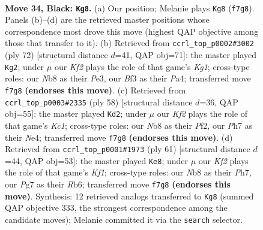 \documentclass[11pt]{article}
\begin{document}
\clearpage

\begin{figure}[p]\centering
\begin{subfigure}{0.46\textwidth}\centering
\resizebox{\linewidth}{!}{%
\newchessgame
\chessboard[
  setfen={rn6/p1R2kpp/5p2/1P2p2P/P7/4Nb2/8/R1K5 b - - 7 34},
  showmover=false,
  pgfstyle=straightmove, color=movearrow, markmove={f7-g8}
]}
\caption{}
\end{subfigure}\hfill
\begin{subfigure}{0.46\textwidth}\centering
\resizebox{\linewidth}{!}{%
\newchessgame
\chessboard[
  setfen={1r3k2/6p1/p1B2p1p/8/PPR5/4P1P1/5P1P/3r2K1 w - - 3 37},
  showmover=false,
  pgfstyle=straightmove, color=movearrow, markmove={g1-g2}
]}
\caption{}
\end{subfigure}
\\[4pt]
\begin{subfigure}{0.46\textwidth}\centering
\resizebox{\linewidth}{!}{%
\newchessgame
\chessboard[
  setfen={3r3k/5p1n/4p2B/1p2P3/3pN3/P7/1PP2P1R/2K3r1 w - - 2 30},
  showmover=false,
  pgfstyle=straightmove, color=movearrow, markmove={c1-d2}
]}
\caption{}
\end{subfigure}\hfill
\begin{subfigure}{0.46\textwidth}\centering
\resizebox{\linewidth}{!}{%
\newchessgame
\chessboard[
  setfen={5k2/1p4pp/pr6/1b4P1/3P1R1P/2N5/1P3K2/8 b - - 1 31},
  showmover=false,
  pgfstyle=straightmove, color=movearrow, markmove={f8-e8}
]}
\caption{}
\end{subfigure}
\caption{\textbf{Move 34, Black: \texttt{Kg8}.} (a) Our position; Melanie plays \texttt{Kg8} (\texttt{f7g8}). Panels (b)--(d) are the retrieved master positions whose correspondence most drove this move (highest QAP objective among those that transfer to it). (b) Retrieved from \texttt{ccrl\_top\_p0002\#3002} (ply 72) [structural distance $d$=41, QAP obj=71]: the master played \texttt{Kg2}; under $\mu$ our \emph{Kf2} plays the role of that game's \emph{Kg1}; cross-type roles: our \emph{N}b8 as their \emph{P}e3, our \emph{B}f3 as their \emph{P}a4; transferred move \texttt{f7g8} \textbf{(endorses this move)}. (c) Retrieved from \texttt{ccrl\_top\_p0003\#2335} (ply 58) [structural distance $d$=36, QAP obj=55]: the master played \texttt{Kd2}; under $\mu$ our \emph{Kf2} plays the role of that game's \emph{Kc1}; cross-type roles: our \emph{N}b8 as their \emph{P}f2, our \emph{P}h7 as their \emph{N}e4; transferred move \texttt{f7g8} \textbf{(endorses this move)}. (d) Retrieved from \texttt{ccrl\_top\_p0001\#1973} (ply 61) [structural distance $d$=44, QAP obj=53]: the master played \texttt{Ke8}; under $\mu$ our \emph{Kf2} plays the role of that game's \emph{Kf1}; cross-type roles: our \emph{N}b8 as their \emph{P}h7, our \emph{P}g7 as their \emph{R}b6; transferred move \texttt{f7g8} \textbf{(endorses this move)}. Synthesis: 12 retrieved analogs transferred to \texttt{Kg8} (summed QAP objective 333, the strongest correspondence among the candidate moves); Melanie committed it via the \texttt{search} selector.}
\label{fig:thought-m67}
\end{figure}
\end{document}
